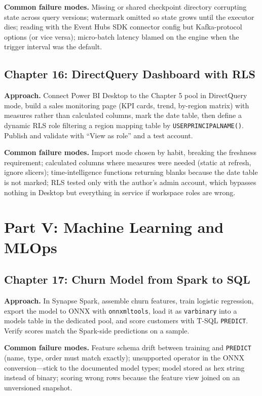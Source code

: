 \textbf{Common failure modes.} Missing or shared checkpoint directory corrupting state across
query versions; watermark omitted so state grows until the executor dies; reading with the
Event Hubs SDK connector config but Kafka-protocol options (or vice versa); micro-batch latency
blamed on the engine when the trigger interval was the default.

\subsection*{Chapter 16: DirectQuery Dashboard with RLS}
\textbf{Approach.} Connect Power BI Desktop to the Chapter 5 pool in DirectQuery mode, build a
sales monitoring page (KPI cards, trend, by-region matrix) with measures rather than calculated
columns, mark the date table, then define a dynamic RLS role filtering a region mapping table by
\texttt{USERPRINCIPALNAME()}. Publish and validate with ``View as role'' and a test account.

\textbf{Common failure modes.} Import mode chosen by habit, breaking the freshness requirement;
calculated columns where measures were needed (static at refresh, ignore slicers);
time-intelligence functions returning blanks because the date table is not marked; RLS tested
only with the author's admin account, which bypasses nothing in Desktop but everything in service
if workspace roles are wrong.

\section{Part V: Machine Learning and MLOps}

\subsection*{Chapter 17: Churn Model from Spark to SQL}
\textbf{Approach.} In Synapse Spark, assemble churn features, train logistic regression, export
the model to ONNX with \texttt{onnxmltools}, load it as \texttt{varbinary} into a models table in
the dedicated pool, and score customers with T-SQL \texttt{PREDICT}. Verify scores match the
Spark-side predictions on a sample.

\textbf{Common failure modes.} Feature schema drift between training and \texttt{PREDICT} (name,
type, order must match exactly); unsupported operator in the ONNX conversion---stick to the
documented model types; model stored as hex string instead of binary; scoring wrong rows because
the feature view joined on an unversioned snapshot.

